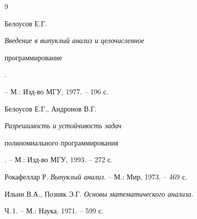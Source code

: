 \begin{thebibliography}{9} 


 




Белоусов Е.Г. {\em Введение в выпуклый анализ и целочисленное 


программирование}. 


-- М.: Изд-во МГУ, 1977. -- 196 с. 




Белоусов Е.Г., Андронов В.Г. {\em Разрешимость и устойчивость задач 


полиномиального программирования}. -- М.: Изд-во МГУ, 1993. -- 272 с. 




Рокафеллар Р. {\em Выпуклый анализ}. -- М.: Мир, 1973. -- 469 с. 




Ильин В.А., Позняк Э.Г. {\em Основы математического анализа}. 


Ч.\,1. -- М.: Наука, 1971. -- 599 с. 


 


\end{thebibliography} 


 


\vskip 0.5cm 


 






 


\label{end} 


 


 


